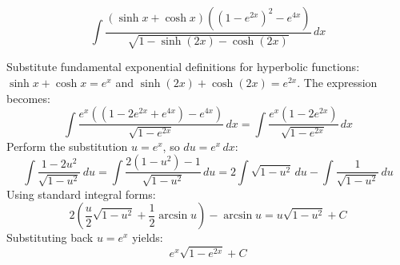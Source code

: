 \begin{questions}
    \question
    \[ \int \frac{(\sinh x + \cosh x)((1 - e^{2x})^2 - e^{4x})}{\sqrt{1 - \sinh(2x) - \cosh(2x)}} \, dx \]
    \begin{solution}
        Substitute fundamental exponential definitions for hyperbolic functions: $\sinh x + \cosh x = e^x$ and $\sinh(2x) + \cosh(2x) = e^{2x}$. The expression becomes:
        \[ \int \frac{e^x \left( (1 - 2e^{2x} + e^{4x}) - e^{4x} \right)}{\sqrt{1 - e^{2x}}} \, dx = \int \frac{e^x (1 - 2e^{2x})}{\sqrt{1 - e^{2x}}} \, dx \]
        Perform the substitution $u = e^x$, so $du = e^x \, dx$:
        \[ \int \frac{1 - 2u^2}{\sqrt{1 - u^2}} \, du = \int \frac{2(1 - u^2) - 1}{\sqrt{1 - u^2}} \, du = 2\int \sqrt{1-u^2} \, du - \int \frac{1}{\sqrt{1-u^2}} \, du \]
        Using standard integral forms:
        \[ 2 \left( \frac{u}{2}\sqrt{1-u^2} + \frac{1}{2}\arcsin u \right) - \arcsin u = u\sqrt{1-u^2} + C \]
        Substituting back $u = e^x$ yields:
        \[ e^x \sqrt{1 - e^{2x}} + C \]
    \end{solution}
\end{questions}